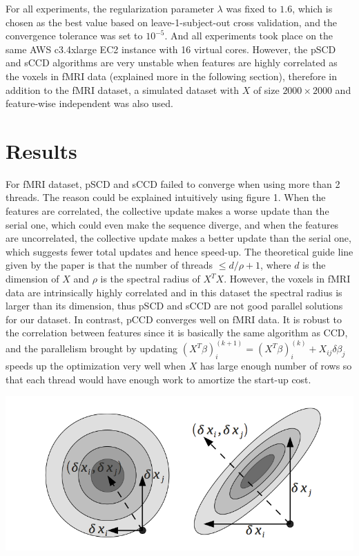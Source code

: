 \documentclass[11 pt, a4paper]{article}  %
\begin{document}
For all experiments, the regularization parameter $\lambda$ was fixed to $1.6$, which is chosen as the best value based on leave-1-subject-out cross validation, and the convergence tolerance was set to $10^{-5}$. And all experiments took place on the same AWS c3.4xlarge EC2 instance with 16 virtual cores. However, the pSCD and sCCD algorithms are very unstable when features are highly correlated as the voxels in fMRI data (explained more in the following section), therefore in addition to the fMRI dataset, a simulated dataset with $X$ of size $2000\times2000$ and feature-wise independent was also used. 

\section{Results}
For fMRI dataset, pSCD and sCCD failed to converge when using more than 2 threads. The reason could be explained intuitively using figure 1. When the features are correlated, the collective update makes a worse update than the serial one, which could even make the sequence diverge, and when the features are uncorrelated, the collective update makes a better update than the serial one, which suggests fewer total updates and hence speed-up. The theoretical guide line given by the paper is that the number of threads $\leq d/\rho + 1$, where $d$ is the dimension of $X$ and $\rho$ is the spectral radius of $X^TX$. However, the voxels in fMRI data are intrinsically highly correlated and in this dataset the spectral radius is larger than its dimension, thus pSCD and sCCD are not good parallel solutions for our dataset. In contrast, pCCD converges well on fMRI data. It is robust to the correlation between features since it is basically the same algorithm as CCD, and the parallelism brought by updating $(X^T\beta)_i^{(k+1)} = (X^T\beta)_i^{(k)} + X_{ij} \delta \beta_j $ speeds up the optimization very well when $X$ has large enough number of rows so that each thread would have enough work to amortize the start-up cost.\\ 


\begin{center}
\includegraphics[scale=0.68]{update.png}
\end{center}
\end{document}
